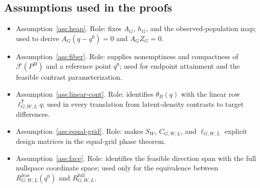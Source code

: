 \documentclass[11pt]{article}
\newcommand{\transpose}{\mathsf{T}}
\theoremstyle{definition}
\theoremstyle{plain}
\theoremstyle{remark}
\begin{document}
\subsection*{Assumptions used in the proofs}
\begin{itemize}[leftmargin=*]
  \item Assumption~\ref{ass:heap}.  Role: fixes \(A_G\), \(h_G\), and the observed-population map; used to derive \(A_G(q-q^0)=0\) and \(A_GZ_G=0\).
  \item Assumption~\ref{ass:fiber}.  Role: supplies nonemptiness and compactness of \(\mathcal{F}(P^H)\) and a reference point \(q^0\); used for endpoint attainment and the feasible contrast parameterization.
  \item Assumption~\ref{ass:linear-cont}.  Role: identifies \(\theta_B(q)\) with the linear row \(\ell_{G,W,L}^{\transpose}q\); used in every translation from latent-density contrasts to target differences.
  \item Assumption~\ref{ass:equal-grid}.  Role: makes \(S_W\), \(C_{G,W,L}\), and \(\ell_{G,W,L}\) explicit design matrices in the equal-grid phase theorem.
  \item Assumption~\ref{ass:face}.  Role: identifies the feasible direction span with the full nullspace coordinate space; used only for the equivalence between \(R^{\mathrm{feas}}_{G,W,L}(q^0)\) and \(R^{\mathrm{full}}_{G,W,L}\).
\end{itemize}
\end{document}
